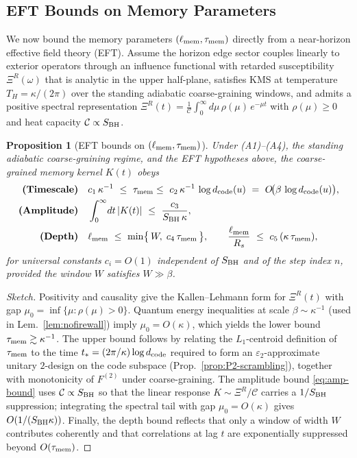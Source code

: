 \documentclass[a4paper,11pt]{article}
\theoremstyle{plain}
\newtheorem{proposition}{Proposition}
\theoremstyle{definition}
\theoremstyle{remark}
\begin{document}
\subsection{EFT Bounds on Memory Parameters} %
\label{sec:eft-bounds}
We now bound the memory parameters $(\ell_{\rm mem},\tau_{\rm mem})$ directly from a near-horizon effective field theory (EFT).
Assume the horizon edge sector couples linearly to exterior operators through an influence functional with retarded susceptibility
$\Xi^R(\omega)$ that is analytic in the upper half-plane, satisfies KMS at temperature $T_H=\kappa/(2\pi)$ over the standing adiabatic coarse-graining windows,
and admits a positive spectral representation $\Xi^R(t)=\frac{1}{\mathcal{C}}\int_0^\infty\!d\mu\,\rho(\mu)\,e^{-\mu t}$ with
$\rho(\mu)\ge 0$ and heat capacity $\mathcal{C}\propto S_{\rm BH}$.

\begin{proposition}[EFT bounds on $(\ell_{\rm mem},\tau_{\rm mem})$]\label{prop:eft-bounds}
Under (A1)--(A4), the standing adiabatic coarse-graining regime, and the EFT hypotheses above, the coarse-grained memory kernel $K(t)$ obeys
\begin{align}
\textbf{(Timescale)}\quad & c_1\,\kappa^{-1} \ \le\ \tau_{\rm mem}
\le\ c_2\,\kappa^{-1}\,\log d_{\rm code}(u)\ =\ O\!\big(\beta\,\log d_{\rm code}(u)\big), \label{eq:tau-bounds}\\
\textbf{(Amplitude)}\quad & \int_0^\infty\!dt\,|K(t)|\ \le\ \frac{c_3}{S_{\rm BH}\,\kappa}, \label{eq:amp-bound}\\
\textbf{(Depth)}\quad & \ell_{\rm mem}\ \le\ \min\!\big\{\,W,\; c_4\,\tau_{\rm mem}\,\big\},\qquad
\frac{\ell_{\rm mem}}{R_s}\ \le\ c_5\,(\kappa\,\tau_{\rm mem}), \label{eq:depth-bound}
\end{align}
for universal constants $c_i=O(1)$ independent of $S_{\rm BH}$ and of the step index $n$, provided the window $W$ satisfies $W\gg\beta$.
\end{proposition}

\begin{proof}[Sketch]
Positivity and causality give the Kallen--Lehmann form for $\Xi^R(t)$ with gap $\mu_0=\inf\{\mu:\rho(\mu)\!>\!0\}$. Quantum energy
inequalities at scale $\beta\sim\kappa^{-1}$ (used in Lem.~\ref{lem:nofirewall}) imply $\mu_0=O(\kappa)$, which yields the lower bound
$\tau_{\rm mem}\gtrsim \kappa^{-1}$. The upper bound follows by relating the $L_1$-centroid definition of $\tau_{\rm mem}$ to the time
$t_\ast=(2\pi/\kappa)\log d_{\rm code}$ required to form an $\varepsilon_2$-approximate unitary $2$-design on the code subspace (Prop.~\ref{prop:P2-scrambling}), together with monotonicity of $F^{(2)}$ under coarse-graining. The amplitude bound \eqref{eq:amp-bound} uses
$\mathcal{C}\propto S_{\rm BH}$ so that the linear response $K\!\sim\!\Xi^R/\mathcal{C}$ carries a $1/S_{\rm BH}$ suppression; integrating
the spectral tail with gap $\mu_0=O(\kappa)$ gives $O(1/(S_{\rm BH}\kappa))$. Finally, the depth bound reflects that only a window of width
$W$ contributes coherently and that correlations at lag $t$ are exponentially suppressed beyond $O(\tau_{\rm mem})$.
\end{proof}
\end{document}
